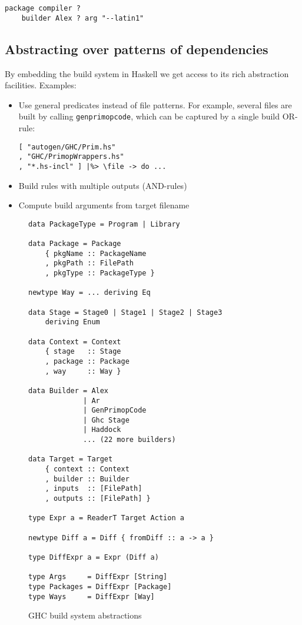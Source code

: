 \begin{verbatim}
package compiler ?
    builder Alex ? arg "--latin1"
\end{verbatim}

\subsection{Abstracting over patterns of dependencies}


By embedding the build system in Haskell we get access to its rich abstraction
facilities. Examples:
\begin{itemize}
  \item Use general predicates instead of file patterns. For example, several
  files are built by calling \texttt{genprimopcode}, which can be captured by a
  single build OR-rule:

\begin{lstlisting}[basicstyle=\ttfamily]
[ "autogen/GHC/Prim.hs"
, "GHC/PrimopWrappers.hs"
, "*.hs-incl" ] |%> \file -> do ...
\end{lstlisting}

  \item Build rules with multiple outputs (AND-rules)
  \item Compute build arguments from target filename
\end{itemize}

\begin{figure}
\begin{lstlisting}[basicstyle=\ttfamily]
data PackageType = Program | Library

data Package = Package
    { pkgName :: PackageName
    , pkgPath :: FilePath
    , pkgType :: PackageType }

newtype Way = ... deriving Eq

data Stage = Stage0 | Stage1 | Stage2 | Stage3
    deriving Enum

data Context = Context
    { stage   :: Stage
    , package :: Package
    , way     :: Way }

data Builder = Alex
             | Ar
             | GenPrimopCode
             | Ghc Stage
             | Haddock
             ... (22 more builders)

data Target = Target
    { context :: Context
    , builder :: Builder
    , inputs  :: [FilePath]
    , outputs :: [FilePath] }

type Expr a = ReaderT Target Action a

newtype Diff a = Diff { fromDiff :: a -> a }

type DiffExpr a = Expr (Diff a)

type Args     = DiffExpr [String]
type Packages = DiffExpr [Package]
type Ways     = DiffExpr [Way]
\end{lstlisting}
\caption{GHC build system abstractions\label{fig:abstractions}}
\end{figure}

